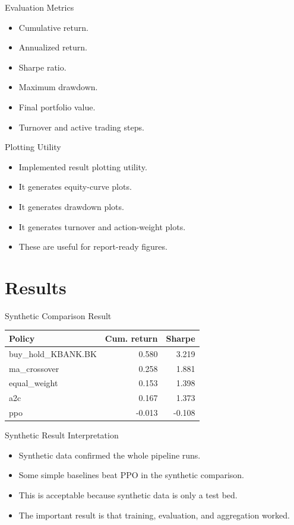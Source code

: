 \documentclass[aspectratio=43,10pt]{beamer}
\begin{document}
\begin{frame}{Evaluation Metrics}
\begin{itemize}
  \item Cumulative return.
  \item Annualized return.
  \item Sharpe ratio.
  \item Maximum drawdown.
  \item Final portfolio value.
  \item Turnover and active trading steps.
\end{itemize}
\end{frame}

\begin{frame}{Plotting Utility}
\begin{itemize}
  \item Implemented result plotting utility.
  \item It generates equity-curve plots.
  \item It generates drawdown plots.
  \item It generates turnover and action-weight plots.
  \item These are useful for report-ready figures.
\end{itemize}
\end{frame}

\section{Results}

\begin{frame}{Synthetic Comparison Result}
\begin{center}
\begin{tabular}{lrr}
\toprule
Policy & Cum. return & Sharpe \\
\midrule
buy\_hold\_KBANK.BK & 0.580 & 3.219 \\
ma\_crossover & 0.258 & 1.881 \\
equal\_weight & 0.153 & 1.398 \\
a2c & 0.167 & 1.373 \\
ppo & -0.013 & -0.108 \\
\bottomrule
\end{tabular}
\end{center}
\end{frame}

\begin{frame}{Synthetic Result Interpretation}
\begin{itemize}
  \item Synthetic data confirmed the whole pipeline runs.
  \item Some simple baselines beat PPO in the synthetic comparison.
  \item This is acceptable because synthetic data is only a test bed.
  \item The important result is that training, evaluation, and aggregation worked.
\end{itemize}
\end{frame}
\end{document}
